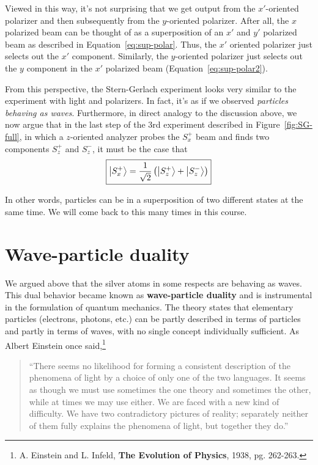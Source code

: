 Viewed in this way, it's not surprising that we get output from the $x'$-oriented polarizer and then subsequently from the $y$-oriented polarizer. After all, the $x$ polarized beam can be thought of as a superposition of an $x'$ and $y'$ polarized beam as described in Equation~\ref{eq:sup-polar}. Thus, the $x'$ oriented polarizer just selects out the $x'$ component. Similarly, the $y$-oriented polarizer just selects out the $y$ component in the $x'$ polarized beam (Equation~\ref{eq:sup-polar2}). \par

From this perspective, the Stern-Gerlach experiment looks very similar to the experiment with light and polarizers. In fact, it's as if we observed \emph{particles behaving as waves}. Furthermore, in direct analogy to the discussion above, we now argue that in the last step of the 3rd experiment described in Figure~\ref{fig:SG-full}, in which a $z$-oriented analyzer probes the $S_x^+$ beam and finds two components $S_z^+$ and $S_z^-$, it must be the case that
\begin{equation*}
	\boxed{\ket{S_x^+} = \frac{1}{\sqrt{2}} \left( \ket{S_z^+} + \ket{S_z^-} \right)}
\end{equation*}

In other words, particles can be in a superposition of two different states at the same time. We will come back to this many times in this course. \par


\section{Wave-particle duality}
We argued above that the silver atoms in some respects are behaving as waves. This dual behavior became known as \textbf{wave-particle duality} and is instrumental in the formulation of quantum mechanics. The theory states that elementary particles (electrons, photons, etc.) can be partly described in terms of particles and partly in terms of waves, with no single concept individually sufficient. As Albert Einstein once said,\footnote{A. Einstein and L. Infeld, \textbf{The Evolution of Physics}, 1938, pg. 262-263.}
\begin{quote}
	``There seems no likelihood for forming a consistent description of the phenomena of light by a choice of only one of the two languages. It seems as though we must use sometimes the one theory and sometimes the other, while at times we may use either. We are faced with a new kind of difficulty. We have two contradictory pictures of reality; separately neither of them fully explains the phenomena of light, but together they do.''
\end{quote}

